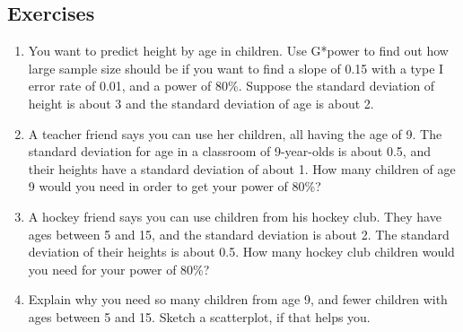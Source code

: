 \documentclass[]{report}\usepackage[]{graphicx}\usepackage[]{color}
\begin{document}
\subsection{Exercises}


\begin{enumerate}

\item You want to predict height by age in children. Use G*power to find out how large sample size should be if you want to find a slope of 0.15 with a type I error rate of 0.01, and a power of 80\%. Suppose the standard deviation of height is about 3 and the standard deviation of age is about 2.

\item A teacher friend says you can use her children, all having the age of 9. The standard deviation for age in a classroom of 9-year-olds is about 0.5, and their heights have a standard deviation of about 1. How many children of age 9 would you need in order to get your power of 80\%?

\item A hockey friend says you can use children from his hockey club. They have ages between 5 and 15, and the standard deviation is about 2. The standard deviation of their heights is about 0.5. How many hockey club children would you need for your power of 80\%?

\item Explain why you need so many children from age 9, and fewer children with ages between 5 and 15. Sketch a scatterplot, if that helps you.


\end{enumerate}
\end{document}
